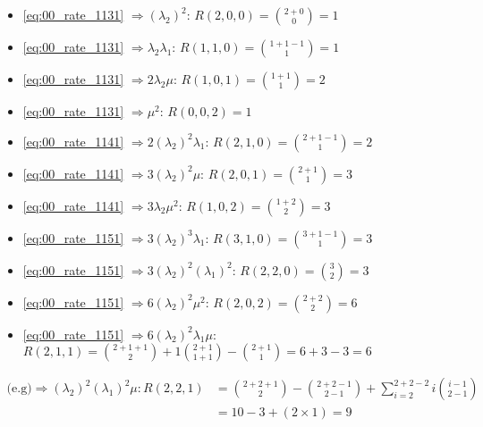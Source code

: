 \tiny
\begin{multicols}{2}
    \begin{itemize}
        \item \eqref{eq:00_rate_1131} \( \Rightarrow (\lambda_2)^2\):
        \(R(2,0,0) = \binom{2+0}{0} = 1\)
        \item \eqref{eq:00_rate_1131} \( \Rightarrow \lambda_2 \lambda_1\):
        \(R(1,1,0) = \binom{1+1-1}{1} = 1\)
        \item \eqref{eq:00_rate_1131} \( \Rightarrow 2 \lambda_2 \mu\):
        \(R(1,0,1) = \binom{1+1}{1} = 2\)
        \item \eqref{eq:00_rate_1131} \( \Rightarrow \mu^2\): \(R(0,0,2) = 1\)
        \item \eqref{eq:00_rate_1141} \( \Rightarrow 2(\lambda_2)^2 \lambda_1\):
        \(R(2,1,0) = \binom{2+1-1}{1} = 2\)
        \item \eqref{eq:00_rate_1141} \( \Rightarrow 3(\lambda_2)^2 \mu\):
        \(R(2,0,1) = \binom{2+1}{1} = 3\)
        \item \eqref{eq:00_rate_1141} \( \Rightarrow 3 \lambda_2 \mu^2\):
        \(R(1,0,2) = \binom{1+2}{2} = 3\)
        \item \eqref{eq:00_rate_1151} \( \Rightarrow 3 (\lambda_2)^3
        \lambda_1\): \(R(3,1,0) = \binom{3+1-1}{1} = 3\)
        \item \eqref{eq:00_rate_1151} \( \Rightarrow 3 (\lambda_2)^2
        (\lambda_1)^2 \): \(R(2,2,0) = \binom{3}{2} = 3\)
        \item \eqref{eq:00_rate_1151} \( \Rightarrow 6 (\lambda_2)^2 \mu ^ 2\):
        \(R(2,0,2) = \binom{2+2}{2} = 6\)
    \end{itemize}
\end{multicols}

\begin{itemize}
    \item \eqref{eq:00_rate_1151} \( \Rightarrow 6 (\lambda_2)^2 \lambda_1 \mu\):
    \(R(2,1,1) = \binom{2+1+1}{2} + 1\binom{2+1}{1+1} - \binom{2+1}{1} =
    6 + 3 - 3 = 6\)
\end{itemize}
\small

\begin{align}
    \text{(e.g)} \Rightarrow (\lambda_2)^2 (\lambda_1)^2 \mu:
    R(2,2,1) & = \binom{2+2+1}{2} - \binom{2+2-1}{2-1} + \sum_{i=2}^{2+2-2}
    i\binom{i-1}{2-1} \nonumber \\
    & = 10 - 3 + (2 \times 1) = 9 \nonumber
\end{align}
\normalsize

